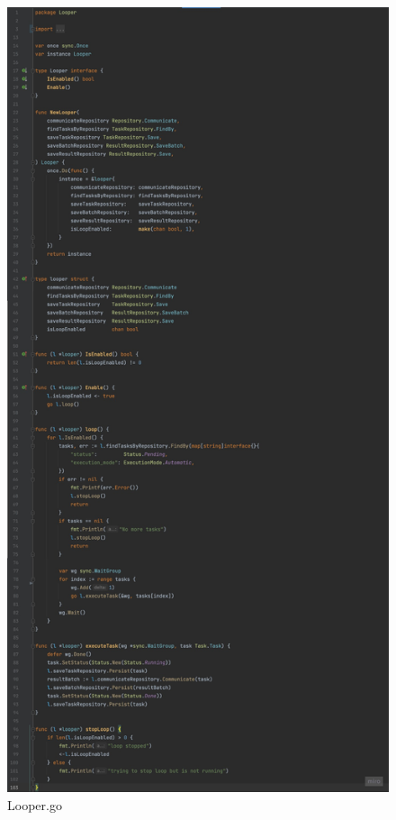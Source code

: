 \begin{figure}[H]
    \centering
    \includegraphics[height=0.4\textheight]{./part/Ejecucion/Seguimiento/TaskEventHandler/img/PFM - Looper}
    \caption{Looper.go}\label{fig:looper}
\end{figure}